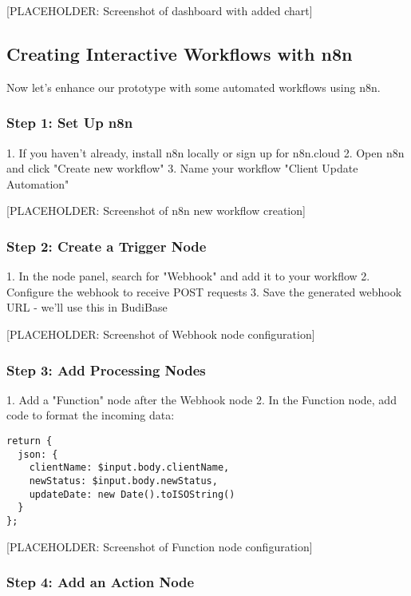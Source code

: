 [PLACEHOLDER: Screenshot of dashboard with added chart]

\subsection{Creating Interactive Workflows with n8n}

Now let's enhance our prototype with some automated workflows using n8n.

\subsubsection{Step 1: Set Up n8n}

1. If you haven't already, install n8n locally or sign up for n8n.cloud
2. Open n8n and click "Create new workflow"
3. Name your workflow "Client Update Automation"

[PLACEHOLDER: Screenshot of n8n new workflow creation]

\subsubsection{Step 2: Create a Trigger Node}

1. In the node panel, search for "Webhook" and add it to your workflow
2. Configure the webhook to receive POST requests
3. Save the generated webhook URL - we'll use this in BudiBase

[PLACEHOLDER: Screenshot of Webhook node configuration]

\subsubsection{Step 3: Add Processing Nodes}

1. Add a "Function" node after the Webhook node
2. In the Function node, add code to format the incoming data:

\begin{lstlisting}
return {
  json: {
    clientName: $input.body.clientName,
    newStatus: $input.body.newStatus,
    updateDate: new Date().toISOString()
  }
};
\end{lstlisting}

[PLACEHOLDER: Screenshot of Function node configuration]

\subsubsection{Step 4: Add an Action Node}

